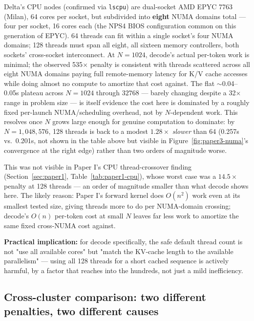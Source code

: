 \documentclass[11pt]{article}
\begin{document}
Delta's CPU nodes (confirmed via \texttt{lscpu}) are dual-socket AMD
EPYC 7763 (Milan), 64 cores per socket, but subdivided into
\textbf{eight} NUMA domains total --- four per socket, 16 cores each
(the NPS4 BIOS configuration common on this generation of EPYC). 64
threads can fit within a single socket's four NUMA domains; 128 threads
must span all eight, all sixteen memory controllers, both sockets'
cross-socket interconnect. At $N=1024$, decode's actual per-token work
is minimal; the observed 535$\times$ penalty is consistent with threads
scattered across all eight NUMA domains paying full remote-memory
latency for K/V cache accesses while doing almost no compute to
amortize that cost against. The flat $\sim$0.04--0.05s plateau across
$N=1024$ through $32768$ --- barely changing despite a 32$\times$ range
in problem size --- is itself evidence the cost here is dominated by a
roughly fixed per-launch NUMA/scheduling overhead, not by $N$-dependent
work. This resolves once $N$ grows large enough for genuine
computation to dominate: by $N=1{,}048{,}576$, 128 threads is back to a
modest $1.28\times$ \emph{slower} than 64 (0.257s vs.\ 0.201s, not
shown in the table above but visible in Figure~\ref{fig:paper3-numa}'s
convergence at the right edge) rather than two orders of magnitude
worse.

This was not visible in Paper I's CPU thread-crossover finding
(Section~\ref{sec:paper1}, Table~\ref{tab:paper1-cpu}), whose worst
case was a $14.5\times$ penalty at 128 threads --- an order of
magnitude smaller than what decode shows here. The likely reason:
Paper I's forward kernel does $O(n^2)$ work even at its smallest tested
size, giving threads more to do per NUMA-domain crossing; decode's
$O(n)$ per-token cost at small $N$ leaves far less work to amortize the
same fixed cross-NUMA cost against.

\textbf{Practical implication:} for decode specifically, the safe
default thread count is not "use all available cores" but "match the
KV-cache length to the available parallelism" --- using all 128 threads
for a short cached sequence is actively harmful, by a factor that
reaches into the hundreds, not just a mild inefficiency.

\subsection{Cross-cluster comparison: two different penalties, two
different causes}
\label{sec:paper3-cluster-compare}
\end{document}
